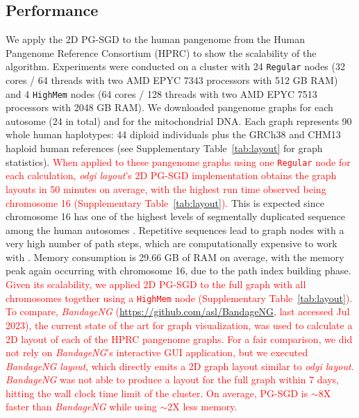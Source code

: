 \documentclass{bioinfo}
\theoremstyle{definition}
\newcommand{\red}[1]{{\textcolor{Red}{#1}}}
\begin{document}
    \subsection{Performance}
	We apply the 2D PG-SGD to the human pangenome \citep{Liao2023} from the Human Pangenome Reference Consortium (HPRC) to show the scalability of the algorithm.	
	Experiments were conducted on a cluster with 24 \texttt{Regular} nodes (32 cores / 64 threads with two AMD EPYC 7343 processors with 512 GB RAM) and 4 \texttt{HighMem} nodes (64 cores / 128 threads with two AMD EPYC 7513 processors with 2048 GB RAM).
	We downloaded pangenome graphs for each autosome (24 in total) and for the mitochondrial DNA.
	Each graph represents 90 whole human haplotypes: 44 diploid individuals plus the GRCh38 \citep{Schneider2017} and CHM13 \citep{Nurk_2021} haploid human references (see Supplementary Table~\ref{tab:layout} for graph statistics).
	\red{When applied to these pangenome graphs using one \texttt{Regular} node for each calculation, \textit{odgi layout}'s 2D PG-SGD implementation obtains the graph layouts in 50 minutes on average, with the highest run time observed being chromosome 16 (Supplementary Table~\ref{tab:layout}).}
	This is expected since chromosome 16 has one of the highest levels of segmentally duplicated sequence among the human autosomes \citep{Martin2004}.
	Repetitive sequences lead to graph nodes with a very high number of path steps, which are computationally expensive to work with \citep{Guarracino2022}.
	Memory consumption is 29.66 GB of RAM on average, with the memory peak again occurring with chromosome 16, due to the path index building phase.
	\red{Given its scalability, we applied 2D PG-SGD to the full graph with all chromosomes together using a \texttt{HighMem} node (Supplementary Table~\ref{tab:layout}).} 
	\red{To compare, \textit{BandageNG} (\url{https://github.com/asl/BandageNG}, last accessed Jul 2023), the current state of the art for graph visualization, was used to calculate a 2D layout of each of the HPRC pangenome graphs. 
	For a fair comparison, we did not rely on \textit{BandageNG}'s interactive GUI application, but we executed \textit{BandageNG layout}, which directly emits a 2D graph layout similar to \textit{odgi layout}. 
	\textit{BandageNG} was not able to produce a layout for the full graph within 7 days, hitting the wall clock time limit of the cluster.
	On average, PG-SGD is $\sim$8X faster than \textit{BandageNG} while using $\sim$2X less memory.}
\end{document}
